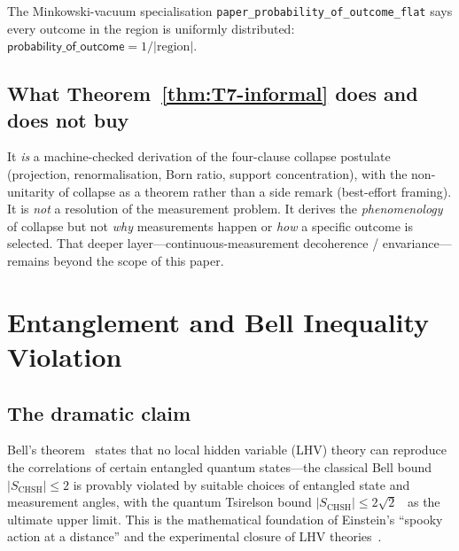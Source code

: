 \documentclass[11pt,a4paper,twoside]{article}
\theoremstyle{definition}
\newcommand{\code}[1]{\texttt{#1}}
\begin{document}
The Minkowski-vacuum specialisation
\code{paper\_probability\_of\_outcome\_flat} says every outcome in the
region is uniformly distributed:
$\mathsf{probability\_of\_outcome}=1/|\mathrm{region}|$.

\subsection{What Theorem~\ref{thm:T7-informal} does and does not
buy}\label{sec:T7-neg}

It \emph{is} a machine-checked derivation of the four-clause collapse
postulate (projection, renormalisation, Born ratio, support
concentration), with the non-unitarity of collapse as a theorem
rather than a side remark (best-effort framing). It is \emph{not} a
resolution of the measurement problem. It derives the
\emph{phenomenology} of collapse but not \emph{why} measurements
happen or \emph{how} a specific outcome is selected. That deeper
layer---continuous-measurement decoherence / envariance---remains
beyond the scope of this paper.

\section{Entanglement and Bell Inequality
Violation}\label{sec:entanglement}

\subsection{The dramatic claim}\label{sec:entanglement-claim}

Bell's theorem~\cite{Bell1964,CHSH1969} states that no local hidden
variable (LHV) theory can reproduce the correlations of certain
entangled quantum states---the classical Bell bound
$|S_{\mathrm{CHSH}}|\le 2$ is provably violated by suitable choices of
entangled state and measurement angles, with the quantum Tsirelson
bound $|S_{\mathrm{CHSH}}|\le 2\sqrt{2}$~\cite{Tsirelson1980} as the
ultimate upper limit. This is the mathematical foundation of
Einstein's ``spooky action at a distance'' and the experimental
closure of LHV theories~\cite{Aspect1982,Hensen2015,Giustina2015}.
\end{document}
